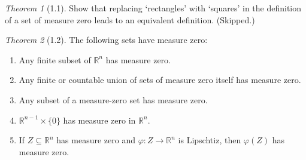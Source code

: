\documentclass[12pt]{article}
\theoremstyle{remark}
\theoremstyle{named}
\newtheorem*{theorem}{Theorem}
\newcommand{\R}{\mathbb R}
\begin{document}
\begin{theorem}[1.1]
    Show that replacing `rectangles' with `squares' in the definition of a set of measure zero leads to an equivalent definition. (Skipped.)
\end{theorem}

\begin{theorem}[1.2]
    The following sets have measure zero:
    \begin{enumerate}
        \item Any finite subset of \(\R^n\) has measure zero.
        \item Any finite or countable union of sets of measure zero itself has measure zero.
        \item Any subset of a measure-zero set has measure zero.
        \item \(\R^{n - 1} \times \{0\}\) has measure zero in \(\R^n\).
        \item If \(Z \subseteq \R^n\) has measure zero and \(\varphi : Z \to \R^n\) is Lipschtiz, then \(\varphi(Z)\) has measure zero. 
    \end{enumerate}
\end{theorem}
\end{document}
